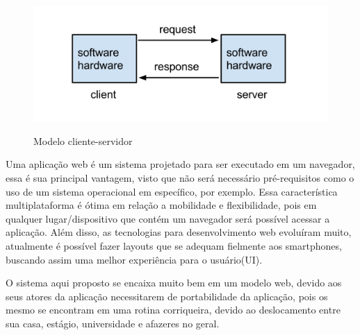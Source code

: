 \begin{figure}[htbp!]
  \centering
  \caption{Modelo cliente-servidor}
  \includegraphics[width=1\textwidth]{figs/web.png}
    \label{fig:web}
\end{figure}

Uma aplicação web é um sistema projetado para ser executado em um navegador, essa é sua principal vantagem, visto que não será necessário pré-requisitos como o uso de um sistema operacional em específico, por exemplo. Essa característica multiplataforma é ótima em relação a mobilidade e flexibilidade, pois em qualquer lugar/dispositivo que contém um navegador será possível acessar a aplicação. Além disso, as tecnologias para desenvolvimento web evoluíram muito, atualmente é possível fazer layouts que se adequam fielmente aos smartphones, buscando assim uma melhor experiência para o usuário(UI)\cite{pandey2013responsive}. \par
O sistema aqui proposto se encaixa muito bem em um modelo web, devido aos seus atores da aplicação necessitarem de portabilidade da aplicação, pois os mesmo se encontram em uma rotina corriqueira, devido ao deslocamento entre sua casa, estágio, universidade e afazeres no geral.



